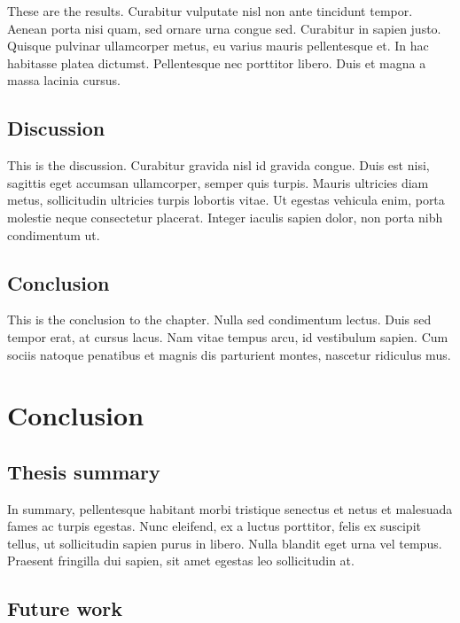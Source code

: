 \documentclass[12pt,a4paper,]{report}
\begin{document}
These are the results. Curabitur vulputate nisl non ante tincidunt
tempor. Aenean porta nisi quam, sed ornare urna congue sed. Curabitur in
sapien justo. Quisque pulvinar ullamcorper metus, eu varius mauris
pellentesque et. In hac habitasse platea dictumst. Pellentesque nec
porttitor libero. Duis et magna a massa lacinia cursus.

\hypertarget{discussion-3}{%
\section{Discussion}\label{discussion-3}}

This is the discussion. Curabitur gravida nisl id gravida congue. Duis
est nisi, sagittis eget accumsan ullamcorper, semper quis turpis. Mauris
ultricies diam metus, sollicitudin ultricies turpis lobortis vitae. Ut
egestas vehicula enim, porta molestie neque consectetur placerat.
Integer iaculis sapien dolor, non porta nibh condimentum ut.

\hypertarget{conclusion-4}{%
\section{Conclusion}\label{conclusion-4}}

This is the conclusion to the chapter. Nulla sed condimentum lectus.
Duis sed tempor erat, at cursus lacus. Nam vitae tempus arcu, id
vestibulum sapien. Cum sociis natoque penatibus et magnis dis parturient
montes, nascetur ridiculus mus.

\hypertarget{conclusion-5}{%
\chapter{Conclusion}\label{conclusion-5}}

\hypertarget{thesis-summary}{%
\section{Thesis summary}\label{thesis-summary}}

In summary, pellentesque habitant morbi tristique senectus et netus et
malesuada fames ac turpis egestas. Nunc eleifend, ex a luctus porttitor,
felis ex suscipit tellus, ut sollicitudin sapien purus in libero. Nulla
blandit eget urna vel tempus. Praesent fringilla dui sapien, sit amet
egestas leo sollicitudin at.

\hypertarget{future-work}{%
\section{Future work}\label{future-work}}
\end{document}
